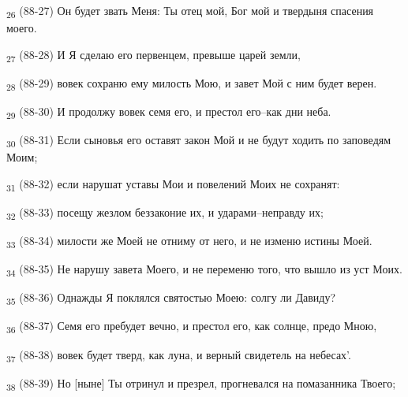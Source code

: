 \begin{tcolorbox}
\textsubscript{26} (88-27) Он будет звать Меня: Ты отец мой, Бог мой и твердыня спасения моего.
\end{tcolorbox}
\begin{tcolorbox}
\textsubscript{27} (88-28) И Я сделаю его первенцем, превыше царей земли,
\end{tcolorbox}
\begin{tcolorbox}
\textsubscript{28} (88-29) вовек сохраню ему милость Мою, и завет Мой с ним будет верен.
\end{tcolorbox}
\begin{tcolorbox}
\textsubscript{29} (88-30) И продолжу вовек семя его, и престол его--как дни неба.
\end{tcolorbox}
\begin{tcolorbox}
\textsubscript{30} (88-31) Если сыновья его оставят закон Мой и не будут ходить по заповедям Моим;
\end{tcolorbox}
\begin{tcolorbox}
\textsubscript{31} (88-32) если нарушат уставы Мои и повелений Моих не сохранят:
\end{tcolorbox}
\begin{tcolorbox}
\textsubscript{32} (88-33) посещу жезлом беззаконие их, и ударами--неправду их;
\end{tcolorbox}
\begin{tcolorbox}
\textsubscript{33} (88-34) милости же Моей не отниму от него, и не изменю истины Моей.
\end{tcolorbox}
\begin{tcolorbox}
\textsubscript{34} (88-35) Не нарушу завета Моего, и не переменю того, что вышло из уст Моих.
\end{tcolorbox}
\begin{tcolorbox}
\textsubscript{35} (88-36) Однажды Я поклялся святостью Моею: солгу ли Давиду?
\end{tcolorbox}
\begin{tcolorbox}
\textsubscript{36} (88-37) Семя его пребудет вечно, и престол его, как солнце, предо Мною,
\end{tcolorbox}
\begin{tcolorbox}
\textsubscript{37} (88-38) вовек будет тверд, как луна, и верный свидетель на небесах'.
\end{tcolorbox}
\begin{tcolorbox}
\textsubscript{38} (88-39) Но [ныне] Ты отринул и презрел, прогневался на помазанника Твоего;
\end{tcolorbox}
